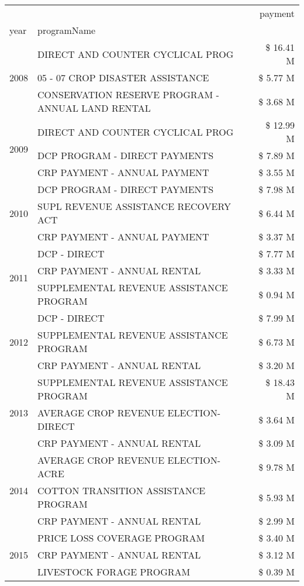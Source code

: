 \begin{tabular}{llr}
\toprule
 &  & payment \\
year & programName &  \\
\midrule
\multirow[t]{3}{*}{2008} & DIRECT AND COUNTER CYCLICAL PROG & \$ 16.41 M \\
 & 05 - 07 CROP DISASTER ASSISTANCE & \$ 5.77 M \\
 & CONSERVATION RESERVE PROGRAM - ANNUAL LAND RENTAL & \$ 3.68 M \\
\cline{1-3}
\multirow[t]{3}{*}{2009} & DIRECT AND COUNTER CYCLICAL PROG & \$ 12.99 M \\
 & DCP PROGRAM - DIRECT PAYMENTS & \$ 7.89 M \\
 & CRP PAYMENT - ANNUAL PAYMENT & \$ 3.55 M \\
\cline{1-3}
\multirow[t]{3}{*}{2010} & DCP PROGRAM - DIRECT PAYMENTS & \$ 7.98 M \\
 & SUPL REVENUE ASSISTANCE RECOVERY ACT & \$ 6.44 M \\
 & CRP PAYMENT - ANNUAL PAYMENT & \$ 3.37 M \\
\cline{1-3}
\multirow[t]{3}{*}{2011} & DCP - DIRECT & \$ 7.77 M \\
 & CRP PAYMENT - ANNUAL RENTAL & \$ 3.33 M \\
 & SUPPLEMENTAL REVENUE ASSISTANCE PROGRAM & \$ 0.94 M \\
\cline{1-3}
\multirow[t]{3}{*}{2012} & DCP - DIRECT & \$ 7.99 M \\
 & SUPPLEMENTAL REVENUE ASSISTANCE PROGRAM & \$ 6.73 M \\
 & CRP PAYMENT - ANNUAL RENTAL & \$ 3.20 M \\
\cline{1-3}
\multirow[t]{3}{*}{2013} & SUPPLEMENTAL REVENUE ASSISTANCE PROGRAM & \$ 18.43 M \\
 & AVERAGE CROP REVENUE ELECTION-DIRECT & \$ 3.64 M \\
 & CRP PAYMENT - ANNUAL RENTAL & \$ 3.09 M \\
\cline{1-3}
\multirow[t]{3}{*}{2014} & AVERAGE CROP REVENUE ELECTION-ACRE & \$ 9.78 M \\
 & COTTON TRANSITION ASSISTANCE PROGRAM & \$ 5.93 M \\
 & CRP PAYMENT - ANNUAL RENTAL & \$ 2.99 M \\
\cline{1-3}
\multirow[t]{3}{*}{2015} & PRICE LOSS COVERAGE PROGRAM & \$ 3.40 M \\
 & CRP PAYMENT - ANNUAL RENTAL & \$ 3.12 M \\
 & LIVESTOCK FORAGE PROGRAM & \$ 0.39 M \\

\end{tabular}
